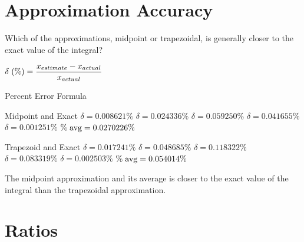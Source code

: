 \documentclass[letterpaper,12pt]{article}
\theoremstyle{definition}
\begin{document}
\newpage

\section{Approximation Accuracy}

\begin{large}

 Which of the approximations, midpoint or trapezoidal, is generally closer to the exact value of the integral?

\end{large}

\vspace{1cm}

\Large\centerline{$\delta\hspace{0.1cm}(\%)=\dfrac{x_{estimate}-x_{actual}}{x_{actual}}$}
\normalsize

\vspace{0.7cm}
\centerline{Percent Error Formula}

\vspace{1cm}

\begin{minipage}{0.45\textwidth}
 \begin{center}
  Midpoint and Exact
  \vskip 16pt
  $\delta=0.008621\%$
  \vskip 16pt
  $\delta=0.024336\%$
  \vskip 16pt
  $\delta=0.059250\%$
  \vskip 16pt
  $\delta=0.041655\%$
  \vskip 16pt
  $\delta=0.001251\%$
  \vskip 16pt
  $\%\hspace{0.1cm}\text{avg}=0.0270226\%$
 \end{center}
\end{minipage}
\hfill
\begin{minipage}{0.45\textwidth}
 \begin{center}
  Trapezoid and Exact
  \vskip 16pt
  $\delta=0.017241\%$
  \vskip 16pt
  $\delta=0.048685\%$
  \vskip 16pt
  $\delta=0.118322\%$
  \vskip 16pt
  $\delta=0.083319\%$
  \vskip 16pt
  $\delta=0.002503\%$
  \vskip 16pt
  $\%\hspace{0.1cm}\text{avg}=0.054014\%$
 \end{center}
\end{minipage}

\vspace{1cm}

The midpoint approximation and its average is closer to the exact value of the integral than the trapezoidal approximation.

\newpage

\section{Ratios}
\end{document}

